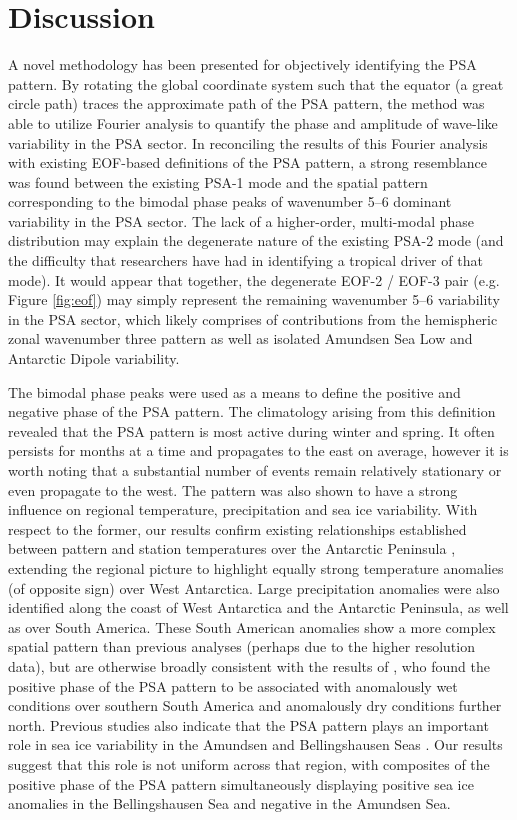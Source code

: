 \section{Discussion}

A novel methodology has been presented for objectively identifying the PSA pattern. By rotating the global coordinate system such that the equator (a great circle path) traces the approximate path of the PSA pattern, the method was able to utilize Fourier analysis to quantify the phase and amplitude of wave-like variability in the PSA sector. In reconciling the results of this Fourier analysis with existing EOF-based definitions of the PSA pattern, a strong resemblance was found between the existing PSA-1 mode and the spatial pattern corresponding to the bimodal phase peaks of wavenumber 5--6 dominant variability in the PSA sector. The lack of a higher-order, multi-modal phase distribution may explain the degenerate nature of the existing PSA-2 mode (and the difficulty that researchers have had in identifying a tropical driver of that mode). It would appear that together, the degenerate EOF-2 / EOF-3 pair (e.g. Figure \ref{fig:eof}) may simply represent the remaining wavenumber 5--6 variability in the PSA sector, which likely comprises of contributions from the hemispheric zonal wavenumber three pattern as well as isolated Amundsen Sea Low and Antarctic Dipole variability.    

The bimodal phase peaks were used as a means to define the positive and negative phase of the PSA pattern. The climatology arising from this definition revealed that the PSA pattern is most active during winter and spring. It often persists for months at a time and propagates to the east on average, however it is worth noting that a substantial number of events remain relatively stationary or even propagate to the west. The pattern was also shown to have a strong influence on regional temperature, precipitation and sea ice variability. With respect to the former, our results confirm existing relationships established between pattern and station temperatures over the Antarctic Peninsula \citep[e.g.][]{Schneider2012,Yu2012}, extending the regional picture to highlight equally strong temperature anomalies (of opposite sign) over West Antarctica. Large precipitation anomalies were also identified along the coast of West Antarctica and the Antarctic Peninsula, as well as over South America. These South American anomalies show a more complex spatial pattern than previous analyses (perhaps due to the higher resolution data), but are otherwise broadly consistent with the results of \citet{Mo2001}, who found the positive phase of the PSA pattern to be associated with anomalously wet conditions over southern South America and anomalously dry conditions further north. Previous studies also indicate that the PSA pattern plays an important role in sea ice variability in the Amundsen and Bellingshausen Seas \citep{Raphael2014}. Our results suggest that this role is not uniform across that region, with composites of the positive phase of the PSA pattern simultaneously displaying positive sea ice anomalies in the Bellingshausen Sea and negative in the Amundsen Sea.  

